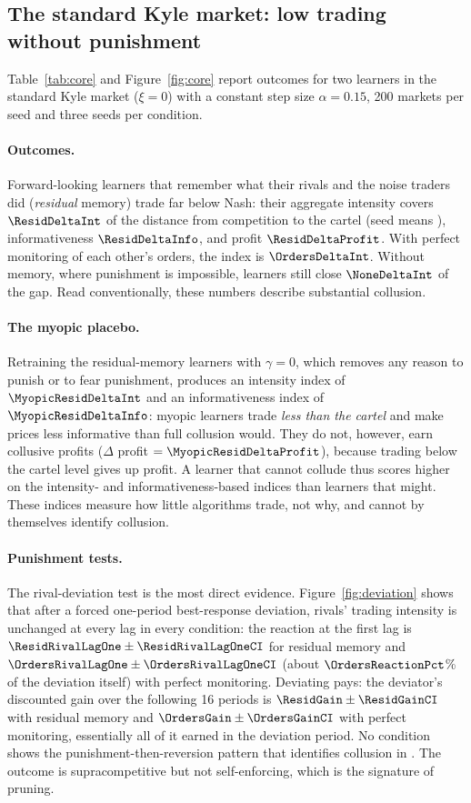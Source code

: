 \subsection{The standard Kyle market: low trading without punishment}
\label{sec:kyle}

Table~\ref{tab:core} and Figure~\ref{fig:core} report outcomes for two
learners in the standard Kyle market ($\xi=0$) with a constant step size
$\alpha=0.15$, 200 markets per seed and three seeds per condition.

\paragraph{Outcomes.} Forward-looking learners that remember what their rivals
and the noise traders did (\emph{residual} memory) trade far below Nash: their
aggregate intensity covers $\ResidDeltaInt$ of the distance from competition to
the cartel (seed means \ResidSeedRange), informativeness $\ResidDeltaInfo$,
and profit $\ResidDeltaProfit$. With perfect monitoring of each other's
orders, the index is $\OrdersDeltaInt$. Without memory, where punishment is
impossible, learners still close $\NoneDeltaInt$ of the gap. Read
conventionally, these numbers describe substantial collusion.

\paragraph{The myopic placebo.} Retraining the residual-memory learners with
$\gamma=0$, which removes any reason to punish or to fear punishment, produces
an intensity index of $\MyopicResidDeltaInt$ and an informativeness index of
$\MyopicResidDeltaInfo$: myopic learners trade \emph{less than the cartel} and
make prices less informative than full collusion would. They do not, however,
earn collusive profits ($\Delta$ profit $=\MyopicResidDeltaProfit$), because
trading below the cartel level gives up profit. A learner that cannot collude
thus scores higher on the intensity- and informativeness-based indices than
learners that might. These indices measure how little algorithms trade, not
why, and cannot by themselves identify collusion.

\paragraph{Punishment tests.} The rival-deviation test is the most direct evidence.
Figure~\ref{fig:deviation} shows that after a forced one-period best-response
deviation, rivals' trading intensity is unchanged at every lag in every
condition: the reaction at the first lag is $\ResidRivalLagOne\pm\ResidRivalLagOneCI$
for residual memory and $\OrdersRivalLagOne\pm\OrdersRivalLagOneCI$ (about
$\OrdersReactionPct$\% of the deviation itself) with perfect monitoring.
Deviating pays: the deviator's discounted gain over the following 16 periods is
$\ResidGain\pm\ResidGainCI$ with residual memory and
$\OrdersGain\pm\OrdersGainCI$ with perfect monitoring, essentially all of it
earned in the deviation period. No condition shows the
punishment-then-reversion pattern that identifies collusion in
\citet{calvano2020}. The outcome is supracompetitive but not
self-enforcing, which is the signature of pruning.

